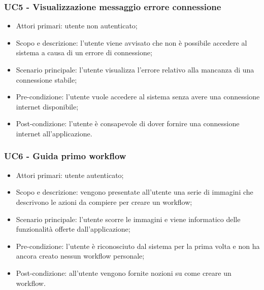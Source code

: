 \subsubsection{UC5 - Visualizzazione messaggio errore connessione}
\begin{itemize}
	\item  Attori primari: utente non autenticato;
	\item  Scopo e descrizione: l'utente viene avvisato che non è possibile accedere al sistema a causa di un errore di connessione;
	\item  Scenario principale: l'utente visualizza l'errore relativo alla mancanza di una connessione stabile;
	\item  Pre-condizione: l'utente vuole accedere al sistema senza avere una connessione internet disponibile;
	\item  Post-condizione: l'utente è consapevole di dover fornire una connessione internet all'applicazione.
\end{itemize}

\subsubsection{UC6 - Guida primo workflow}
\begin{itemize}
	\item  Attori primari: utente autenticato;
	\item  Scopo e descrizione: vengono presentate all'utente una serie di immagini che descrivono le azioni da compiere per creare un workflow;
	\item  Scenario principale: l'utente scorre le immagini e viene informatico delle funzionalità offerte dall'applicazione;
	\item  Pre-condizione: l'utente è riconosciuto dal sistema per la prima volta e non ha ancora creato nessun workflow personale;
	\item  Post-condizione: all'utente vengono fornite nozioni su come creare un workflow.
\end{itemize}


